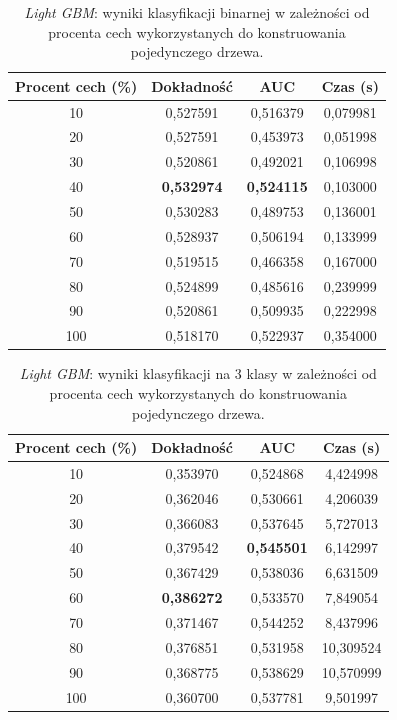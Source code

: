 \documentclass[a4paper, twoside, 11pt, openright]{article}
\begin{document}
\begin{table}[H]
    \centering
    \begin{tabular}{|c|c|c|c|}
    \hline
        \textbf{Procent cech (\%)} & \textbf{Dokładność} & \textbf{AUC} & \textbf{Czas (s)} \\ \hline
10              &  0,527591 &  0,516379 &    0,079981 \\
20              &  0,527591 &  0,453973 &    0,051998 \\
30              &  0,520861 &  0,492021 &    0,106998 \\
40              &  \textbf{0,532974} &  \textbf{0,524115} &    0,103000 \\
50              &  0,530283 &  0,489753 &    0,136001 \\
60              &  0,528937 &  0,506194 &    0,133999 \\
70              &  0,519515 &  0,466358 &    0,167000 \\
80              &  0,524899 &  0,485616 &    0,239999 \\
90              &  0,520861 &  0,509935 &    0,222998 \\
100              &  0,518170 &  0,522937 &    0,354000 \\ \hline
    \end{tabular}
    \caption{\textit{Light GBM}: wyniki klasyfikacji binarnej w zależności od procenta cech wykorzystanych do konstruowania pojedynczego drzewa.}
    \label{tab:lgbm_feature_fraction_binary}
\end{table}

\begin{table}[H]
    \centering
    \begin{tabular}{|c|c|c|c|}
    \hline
        \textbf{Procent cech (\%)} & \textbf{Dokładność} & \textbf{AUC} & \textbf{Czas (s)} \\ \hline
10              &  0,353970 &  0,524868 &    4,424998 \\
20              &  0,362046 &  0,530661 &    4,206039 \\
30              &  0,366083 &  0,537645 &    5,727013 \\
40              &  0,379542 &  \textbf{0,545501} &    6,142997 \\
50              &  0,367429 &  0,538036 &    6,631509 \\
60              &  \textbf{0,386272} &  0,533570 &    7,849054 \\
70              &  0,371467 &  0,544252 &    8,437996 \\
80              &  0,376851 &  0,531958 &   10,309524 \\
90             &  0,368775 &  0,538629 &   10,570999 \\
100              &  0,360700 &  0,537781 &    9,501997 \\ \hline
    \end{tabular}
    \caption{\textit{Light GBM}: wyniki klasyfikacji na 3 klasy w zależności od procenta cech wykorzystanych do konstruowania pojedynczego drzewa.}
    \label{tab:lgbm_feature_fraction_discrete}
\end{table}
\end{document}
